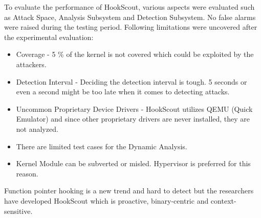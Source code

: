 \documentclass[11pt]{article}
\begin{document}
	To evaluate the performance of HookScout, various aspects were evaluated such as Attack Space, Analysis Subsystem and Detection Subsystem. No false alarms were raised during the testing period. Following limitations were uncovered after the experimental evaluation:
	\begin{itemize}
		\item Coverage - 5 \% of the kernel is not covered which could be exploited by the attackers.
		\item Detection Interval - Deciding the detection interval is tough. 5 seconds or even a second might be too late when it comes to detecting attacks.
		\item Uncommon Proprietary Device Drivers - HookScout utilizes QEMU (Quick Emulator) and since other proprietary drivers are never installed, they are not analyzed.
		\item There are limited test cases for the Dynamic Analysis.
		\item Kernel Module can be subverted or misled. Hypervisor is preferred for this reason.
	\end{itemize}
	Function pointer hooking is a new trend and hard to detect but the researchers have developed HookScout which is proactive, binary-centric and context-sensitive.
	
\end{document}
